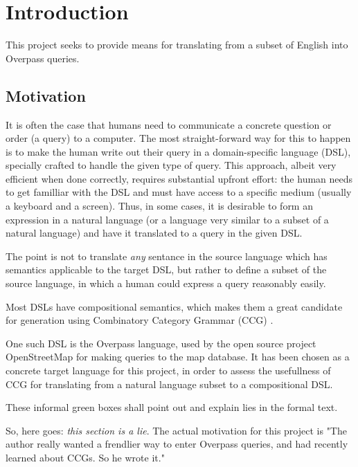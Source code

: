 \documentclass[main.tex]{subfiles}
\begin{document}
\section{Introduction}
This project seeks to provide means for translating from a subset of English
into Overpass queries.

\subsection{Motivation}
It is often the case that humans need to communicate a concrete question
or order (a query) to a computer. The most straight-forward way for this to happen is
to make the human write out their query in a domain-specific language (DSL),
specially crafted to handle the given type of query. This approach, albeit
very efficient when done correctly, requires substantial upfront effort:
the human needs to get familliar with the DSL and must have access to a specific
medium (usually a keyboard and a screen). Thus, in some cases, it is desirable
to form an expression in a natural language (or a language very similar to a
subset of a natural language) and have it translated to a query in the given
DSL.

The point is not to translate \emph{any} sentance in the source language
which has semantics applicable to the target DSL, but rather to define a
subset of the source language, in which a human could express a query
reasonably easily.

Most DSLs have compositional semantics, which makes them a great candidate
for generation using Combinatory Category Grammar (CCG) \cite[p.~181]{nts}.

One such DSL is the Overpass language, used by the open source project
OpenStreetMap for making queries to the map database. It has been chosen as
a concrete target language for this project, in order to assess the usefullness
of CCG for translating from a natural language subset to a compositional
DSL.

\begin{greenbox}
    These informal green boxes shall point out and explain lies in the formal text.

    \vspace{2mm}
    So, here goes: \emph{this section is a lie}. The actual motivation for this project
    is "The author really wanted a frendlier way to enter Overpass queries,
    and had recently learned about CCGs. So he wrote it."
\end{greenbox}
\end{document}

